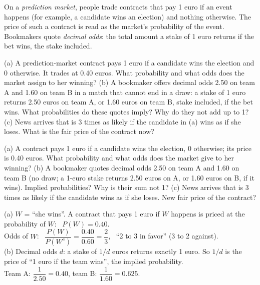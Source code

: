 
\begin{problem}
	\begin{context}
		On a \emph{prediction market}, people trade contracts that pay 1 euro if
		an event happens (for example, a candidate wins an election) and nothing
		otherwise. The price of such a contract is read as the market's
		probability of the event. Bookmakers quote \emph{decimal odds}: the total
		amount a stake of 1 euro returns if the bet wins, the stake included.
	\end{context}
	(a) A prediction-market contract pays 1 euro if a candidate wins the
	election and 0 otherwise. It trades at 0.40 euros. What probability and
	what odds does the market assign to her winning?
	(b) A bookmaker offers decimal odds 2.50 on team A and 1.60 on team B in a
	match that cannot end in a draw: a stake of 1 euro returns 2.50 euros on
	team A, or 1.60 euros on team B, stake included, if the bet wins. What
	probabilities
	do these quotes imply? Why do they not add up to 1?
	(c) News arrives that is 3 times as likely if the candidate in (a) wins as
	if she loses. What is the fair price of the contract now?
\end{problem}

\begin{slideproblem}
	(a) A contract pays 1 euro if a candidate wins the election, 0 otherwise;
	its price is 0.40 euros. What probability and what odds does the market
	give to her winning?
	(b) A bookmaker quotes decimal odds 2.50 on team A and 1.60 on team B (no
	draw; a 1-euro stake returns 2.50 euros on A, or 1.60 euros on B, if it
	wins). Implied
	probabilities? Why is their sum not 1?
	(c) News arrives that is 3 times as likely if the candidate wins as if she
	loses. New fair price of the contract?
\end{slideproblem}

\begin{slides}
	\small
	\exstatement
	\pause
	\sol (a) $W$ = ``she wins''. A contract that pays 1 euro if $W$ happens
	is priced at the probability of $W$: \ $P(W)=0.40$.\\[1mm]
	\pause
	Odds of $W$: \
	$\dfrac{P(W)}{P(W^c)}=\dfrac{0.40}{0.60}=\dfrac23$, \ ``2 to 3 in favor''
	(3 to 2 against).\\[1mm]
	\pause
	(b) Decimal odds $d$: a stake of $1/d$ euros returns exactly 1 euro. So
	$1/d$ is the price of ``1 euro if the team wins'', the implied
	probability.\\[1mm]
	\pause
	Team A: $\dfrac{1}{2.50}=0.40$, \qquad team B: $\dfrac{1}{1.60}=0.625$.
\end{slides}

